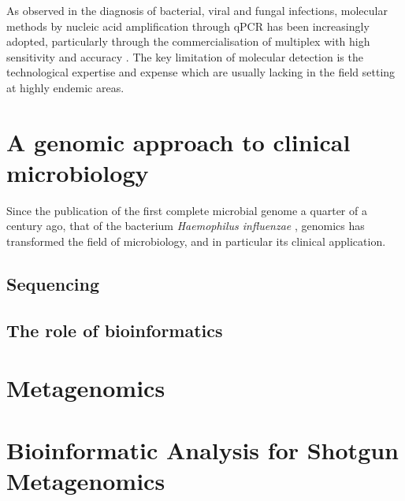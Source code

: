 As observed in the diagnosis of bacterial, viral and fungal infections, molecular methods by nucleic acid amplification through qPCR has been increasingly adopted, particularly through the commercialisation of multiplex with high sensitivity and accuracy \citep{momcilovic_rapid_2019, wong_molecular_2014}. The key limitation of molecular detection is the technological expertise and expense which are usually lacking in the field setting at highly endemic areas.


\section{A genomic approach to clinical microbiology}

Since the publication of the first complete microbial genome a quarter of a century ago, that of the bacterium \textit{Haemophilus influenzae} \citep{hood_dna_1996}, genomics has transformed the field of microbiology, and in particular its clinical application.  

\subsection{Sequencing}

\subsection{The role of bioinformatics}


\section{Metagenomics}

\section{Bioinformatic Analysis for Shotgun Metagenomics}

